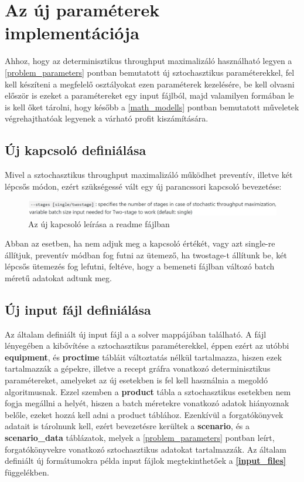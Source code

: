 \section{Az új paraméterek implementációja}
Ahhoz, hogy az determinisztikus throughput maximalizáló használható legyen a \ref{problem_parameters} pontban bemutatott új sztochasztikus paraméterekkel, fel kell készíteni a megfelelő osztályokat ezen paraméterek kezelésére, be kell olvasni először is ezeket a paramétereket egy input fájlból, majd valamilyen formában le is kell őket tárolni, hogy később a \ref{math_modells} pontban bemutatott műveletek végrehajthatóak legyenek a várható profit kiszámítására.
\subsection{Új kapcsoló definiálása}
Mivel a sztochasztikus throughput maximalizáló működhet preventív, illetve két lépcsős módon, ezért szükségessé vált egy új parancssori kapcsoló bevezetése:
\begin{figure}[H]
\begin{center}
\includegraphics[scale=0.38]{switch}
\caption{Az új kapcsoló leírása a readme fájlban}
\label{switch}
\end{center}
\end{figure}
Abban az esetben, ha nem adjuk meg a kapcsoló értékét, vagy azt single-re állítjuk, preventív módban fog futni az ütemező, ha twostage-t állítunk be, két lépcsős ütemezés fog lefutni, feltéve, hogy a bemeneti fájlban változó batch méretű adatokat adtunk meg.
\subsection{Új input fájl definiálása}
Az általam definiált új input fájl a  a solver  mappájában található.
A fájl lényegében a  kibővítése a sztochasztikus paraméterekkel, éppen ezért az utóbbi \textbf{equipment}, és \textbf{proctime} tábláit változtatás nélkül tartalmazza, hiszen ezek tartalmazzák a gépekre, illetve a recept gráfra vonatkozó determinisztikus paramétereket, amelyeket az új esetekben is fel kell használnia a megoldó algoritmusnak.
Ezzel szemben a \textbf{product} tábla a sztochasztikus esetekben nem fogja megállni a helyét, hiszen a batch méretekre vonatkozó adatok hiányoznak belőle, ezeket hozzá kell adni a product táblához.
Ezenkívül a forgatókönyvek adatait is tárolnunk kell, ezért bevezetésre kerültek a\textbf{ scenario}, és a \textbf{scenario\_data} táblázatok, melyek a \ref{problem_parameters} pontban leírt, forgatókönyvekre vonatkozó sztochasztikus adatokat tartalmazzák.
Az általam definiált új formátumokra példa input fájlok megtekinthetőek a \textbf{\ref{input_files}} függelékben.
